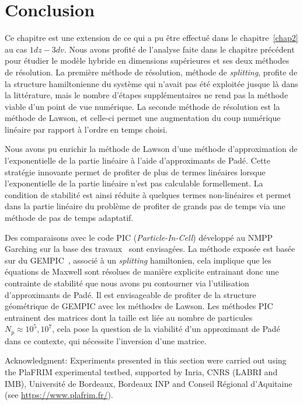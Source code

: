 
\section{Conclusion}

Ce chapitre est une extension de ce qui a pu être effectué dans le chapitre~\ref{chap2} au cas $1dz-3dv$. Nous avons profité de l'analyse faite dans le chapitre précédent pour étudier le modèle hybride en dimensions supérieures et ses deux méthodes de résolution. La première méthode de résolution, méthode de \emph{splitting}, profite de la structure hamiltonienne du système qui n'avait pas été exploitée jusque là dans la littérature, mais le nombre d'étapes supplémentaires ne rend pas la méthode viable d'un point de vue numérique. La seconde méthode de résolution est la méthode de Lawson, et celle-ci permet une augmentation du coup numérique linéaire par rapport à l'ordre en temps choisi.

Nous avons pu enrichir la méthode de Lawson d'une méthode d'approximation de l'exponentielle de la partie linéaire à l'aide d'approximants de Padé. Cette stratégie innovante permet de profiter de plus de termes linéaires lorsque l'exponentielle de la partie linéaire n'est pas calculable formellement. La condition de stabilité est ainsi réduite à quelques termes non-linéaires et permet dans la partie linéaire du problème de profiter de grands pas de temps via une méthode de pas de temps adaptatif.

Des comparaisons avec le code PIC (\emph{Particle-In-Cell}) développé au NMPP Garching sur la base des travaux~\cite{Holderied:2020} sont envisagées. La méthode exposée est basée sur du GEMPIC~\cite{Kraus:2017}, associé à un \emph{splitting} hamiltonien, cela implique que les équations de Maxwell sont résolues de manière explicite entrainant donc une contrainte de stabilité que nous avons pu contourner via l'utilisation d'approximants de Padé. Il est envisageable de profiter de la structure géométrique de GEMPIC avec les méthodes de Lawson. Les méthodes PIC entrainent des matrices dont la taille est liée au nombre de particules $N_p\approx 10^5,10^7$, cela pose la question de la viabilité d'un approximant de Padé dans ce contexte, qui nécessite l'inversion d'une matrice.

\vfill

\begin{otherlanguage}{english}
Acknowledgment: Experiments presented in this section were carried out using the PlaFRIM experimental testbed, supported by Inria, CNRS (LABRI and IMB), Université de Bordeaux, Bordeaux INP and Conseil Régional d’Aquitaine (see \url{https://www.plafrim.fr/}).
\end{otherlanguage}
